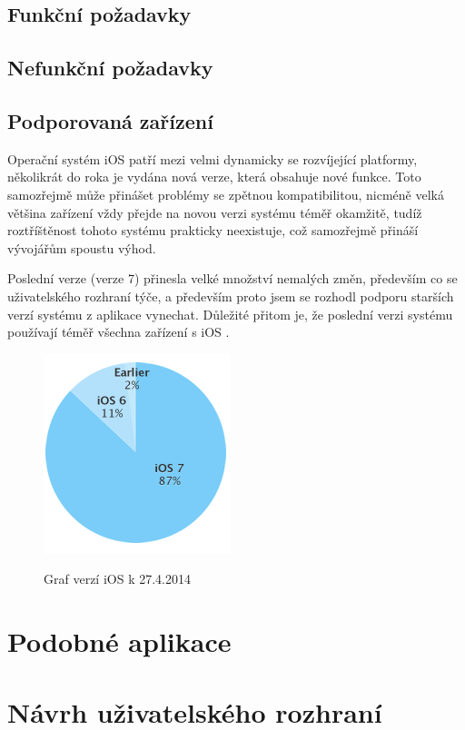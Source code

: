 \documentclass[thesis=B,czech]{FITthesis}[2012/06/26]
\begin{document}
\subsection{Funkční požadavky}

\subsection{Nefunkční požadavky}

\subsection{Podporovaná zařízení}

	Operační systém iOS patří mezi velmi dynamicky se rozvíjející platformy, několikrát do roka je vydána nová verze, která obsahuje nové funkce. Toto samozřejmě může přinášet problémy se zpětnou kompatibilitou, nicméně velká většina zařízení vždy přejde na novou verzi systému téměř okamžitě, tudíž roztříštěnost tohoto systému prakticky neexistuje, což samozřejmě přináší vývojářům spoustu výhod.

	Poslední verze (verze 7) přinesla velké množství nemalých změn, především co se uživatelského rozhraní týče, a především proto jsem se rozhodl podporu starších verzí systému z aplikace vynechat. Důležité přitom je, že poslední verzi systému používají téměř všechna zařízení s iOS \cite{devAppleStats}.

	\begin{figure}
		\centering
		\includegraphics{img/ios7stats}
		\caption{Graf verzí iOS k 27.4.2014}\label{graph:ios7_stats}\cite{devAppleStats}
	\end{figure}

\section{Podobné aplikace}\label{sec:competition}

\section{Návrh uživatelského rozhraní}
\end{document}
